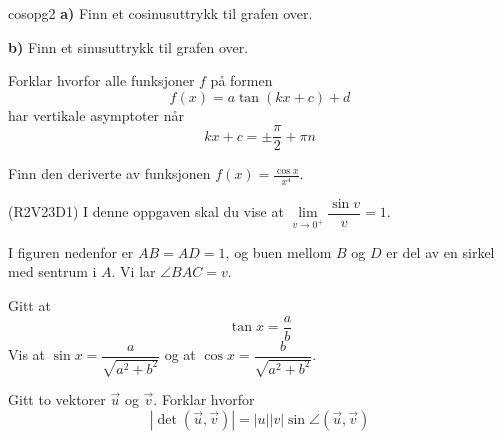 \newpage
{}
\vspace{-10 pt}
{cosopg2}
\vs
\textbf{a)} Finn et cosinusuttrykk til grafen over.\os

\textbf{b)} Finn et sinusuttrykk til grafen over.


Forklar hvorfor alle funksjoner $ f $ på formen
\[ f(x)= a \tan (kx+c)+d\]
har vertikale asymptoter når
\[ kx+c=\pm \frac{\pi}{2}+\pi n \]

Finn den deriverte av funksjonen $ f(x)=\frac{\cos x}{x^4} $.
\newpage

(R2V23D1)\os
I denne oppgaven skal du vise at $ \lim\limits_{v\to 0^+} \dfrac{\sin v}{v}=1 $.\os

I figuren nedenfor er $ AB=AD=1 $, og buen mellom $ B $ og $ D $ er del av en sirkel med sentrum i $ A $. Vi lar $ \angle BAC=v $.

Gitt at
\[ \tan x = \frac{a}{b} \]
Vis at $ \sin x = \dfrac{a}{\sqrt{a^2+b^2}} $ og at $ \cos x = \dfrac{b}{\sqrt{a^2+b^2}} $.

Gitt to vektorer $ \vec{u} $ og $ \vec{v} $. Forklar hvorfor
\[ |\det(\vec{u}, \vec{v})|=|u||v|\sin\angle(\vec{u}, \vec{v}) \]

\begin{comment}

\ekspop
I denne oppgaven skal vi komme fram til to viktige resultater, nemlig at:
\alg{
\lim\limits_{x\to 0}\frac{\sin x}{x}&=1 \\ &\\
\lim\limits_{x\to 0}\frac{\cos x-1}{x}&=0 	
}
Når vi i \textsl{Kapittel 6} finner den deriverte av $ \sin x $ og $ \cos x $, brukes blant annet disse resultatene.
\begin{figure}[H]
\centering
\texttt{[image: \\asym\{sinx]}}
\end{figure}
a) Bruk formlikhet til å vise at $ \tan x $ er høyden i figuren over.

b) Forklar hvorfor vi må ha at:
\[ \frac{\sin x}{x}<1 \]
c) Buen $ x $ utgjør $ \frac{x}{2\pi} $ av omkretsen til enhetssirkelen. Vis at arealet av sektoren til $ x $ blir $ \frac{1}{2}x $.

d) Forklar hvorfor vi må ha at:
\alg{
\frac{1}{2}x&<\frac{1}{2}\tan x	\\
x&<\tan x	
}
e) Bruk ulikhetene fra \textsl{b} og \textsl{d} til å vise at:
\[ \lim\limits_{x\to 0} \frac{\sin x}{x} =1 \]

f) Vis at:
\[\lim\limits_{x\to 0} \frac{\cos x-1}{x}=0 \]
\big(Hint: Multipliser ligningen med $ \frac{\cos x+1}{\cos x+1} $ og bruk deretter det du fant i $ e $.\big) \\
\end{comment}

